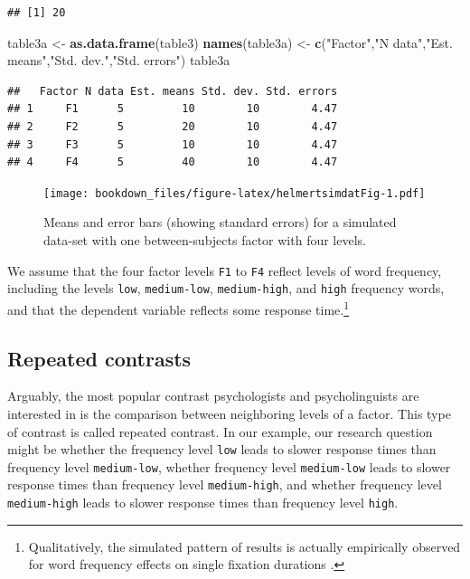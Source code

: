 \documentclass[12pt,]{krantz}
\newenvironment{Shaded}{\begin{snugshade}}{\end{snugshade}}
\newcommand{\KeywordTok}[1]{\textcolor[rgb]{0.13,0.29,0.53}{\textbf{#1}}}
\newcommand{\StringTok}[1]{\textcolor[rgb]{0.31,0.60,0.02}{#1}}
\newcommand{\NormalTok}[1]{#1}
\theoremstyle{definition}
\theoremstyle{definition}
\theoremstyle{definition}
\theoremstyle{remark}
\begin{document}
\begin{verbatim}
## [1] 20
\end{verbatim}

\begin{Shaded}
\begin{Highlighting}[]
\NormalTok{table3a <-}\StringTok{ }\KeywordTok{as.data.frame}\NormalTok{(table3)}
\KeywordTok{names}\NormalTok{(table3a) <-}\StringTok{ }\KeywordTok{c}\NormalTok{(}\StringTok{"Factor"}\NormalTok{,}\StringTok{"N data"}\NormalTok{,}\StringTok{"Est. means"}\NormalTok{,}\StringTok{"Std. dev."}\NormalTok{,}\StringTok{"Std. errors"}\NormalTok{)}
\NormalTok{table3a}
\end{Highlighting}
\end{Shaded}

\begin{verbatim}
##   Factor N data Est. means Std. dev. Std. errors
## 1     F1      5         10        10        4.47
## 2     F2      5         20        10        4.47
## 3     F3      5         10        10        4.47
## 4     F4      5         40        10        4.47
\end{verbatim}

\begin{figure}
\centering
\texttt{[image: bookdown\_files/figure-latex/helmertsimdatFig-1.pdf]}
\caption{\label{fig:helmertsimdatFig}Means and error bars (showing standard
errors) for a simulated data-set with one between-subjects factor with
four levels.}
\end{figure}

We assume that the four factor levels \texttt{F1} to \texttt{F4} reflect
levels of word frequency, including the levels \texttt{low},
\texttt{medium-low}, \texttt{medium-high}, and \texttt{high} frequency
words, and that the dependent variable reflects some response
time.\footnote{Qualitatively, the simulated pattern of results is
  actually empirically observed for word frequency effects on single
  fixation durations \citep{heister2012analysing}.}

\hypertarget{repeatedcontrasts}{\subsection{Repeated
contrasts}\label{repeatedcontrasts}}

Arguably, the most popular contrast psychologists and psycholinguists
are interested in is the comparison between neighboring levels of a
factor. This type of contrast is called repeated contrast. In our
example, our research question might be whether the frequency level
\texttt{low} leads to slower response times than frequency level
\texttt{medium-low}, whether frequency level \texttt{medium-low} leads
to slower response times than frequency level \texttt{medium-high}, and
whether frequency level \texttt{medium-high} leads to slower response
times than frequency level \texttt{high}.
\end{document}
